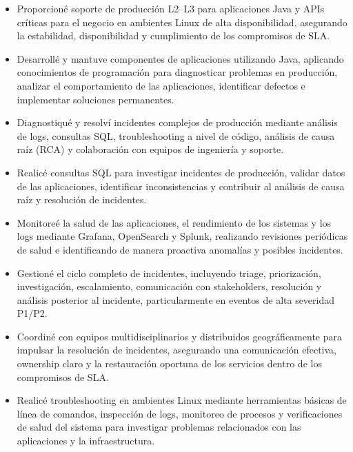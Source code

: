 \documentclass[10pt,letterpaper]{article}
\begin{document}
\begin{itemize}

    \item Proporcioné soporte de producción L2--L3 para aplicaciones Java y APIs críticas para el negocio en ambientes Linux de alta disponibilidad, asegurando la estabilidad, disponibilidad y cumplimiento de los compromisos de SLA.

    \item Desarrollé y mantuve componentes de aplicaciones utilizando Java, aplicando conocimientos de programación para diagnosticar problemas en producción, analizar el comportamiento de las aplicaciones, identificar defectos e implementar soluciones permanentes.

    \item Diagnostiqué y resolví incidentes complejos de producción mediante análisis de logs, consultas SQL, troubleshooting a nivel de código, análisis de causa raíz (RCA) y colaboración con equipos de ingeniería y soporte.

    \item Realicé consultas SQL para investigar incidentes de producción, validar datos de las aplicaciones, identificar inconsistencias y contribuir al análisis de causa raíz y resolución de incidentes.

    \item Monitoreé la salud de las aplicaciones, el rendimiento de los sistemas y los logs mediante Grafana, OpenSearch y Splunk, realizando revisiones periódicas de salud e identificando de manera proactiva anomalías y posibles incidentes.

    \item Gestioné el ciclo completo de incidentes, incluyendo triage, priorización, investigación, escalamiento, comunicación con stakeholders, resolución y análisis posterior al incidente, particularmente en eventos de alta severidad P1/P2.

    \item Coordiné con equipos multidisciplinarios y distribuidos geográficamente para impulsar la resolución de incidentes, asegurando una comunicación efectiva, ownership claro y la restauración oportuna de los servicios dentro de los compromisos de SLA.

    \item Realicé troubleshooting en ambientes Linux mediante herramientas básicas de línea de comandos, inspección de logs, monitoreo de procesos y verificaciones de salud del sistema para investigar problemas relacionados con las aplicaciones y la infraestructura.


\end{itemize}
\end{document}
